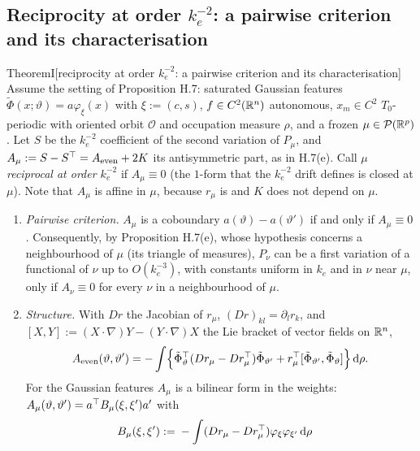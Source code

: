 \subsection{Reciprocity at order \texorpdfstring{$k_e^{-2}$}{k\_e\^{}-2}: a pairwise criterion and its
characterisation}

\begin{thm}{Theorem}{I}[reciprocity at order $k_e^{-2}$: a pairwise criterion and its characterisation]
Assume the setting of Proposition H.7: saturated Gaussian features $\tilde\Phi(x;\vartheta)=a\varphi_\xi(x)$ with
$\xi:=(c,s)$, $f\in C^2(\mathbb{R}^n)$ autonomous, $x_m\in C^2$ $T_0$-periodic with oriented orbit $\mathcal{O}$ and
occupation measure $\rho$, and a frozen $\mu\in\mathcal{P}(\mathbb{R}^p)$. Let $S$ be the $k_e^{-2}$ coefficient of the second
variation of $P_\mu$, and $A_\mu:=S-S^\top=A_{\mathrm{even}}+2K$ its antisymmetric part, as in H.7(e). Call $\mu$
\emph{reciprocal at order $k_e^{-2}$} if $A_\mu\equiv0$ (the $1$-form that the $k_e^{-2}$ drift defines is closed at
$\mu$). Note that $A_\mu$ is affine in $\mu$, because $r_\mu$ is and $K$ does not depend on $\mu$.
\begin{enumerate}[label=(\roman*)]
  \item \emph{Pairwise criterion.} $A_\mu$ is a coboundary $a(\vartheta)-a(\vartheta')$ if and only if
    $A_\mu\equiv0$. Consequently, by Proposition H.7(e), whose hypothesis concerns a neighbourhood of $\mu$ (its
    triangle of measures), $P_\nu$ can be a first variation of a functional of $\nu$ up to $O(k_e^{-3})$, with
    constants uniform in $k_e$ and in $\nu$ near $\mu$, only if $A_\nu\equiv0$ for every $\nu$ in a neighbourhood of
    $\mu$.
  \item \emph{Structure.} With $Dr$ the Jacobian of $r_\mu$, $(Dr)_{kl}=\partial_lr_k$, and
    $[X,Y]:=(X\cdot\nabla)Y-(Y\cdot\nabla)X$ the Lie bracket of vector fields on $\mathbb{R}^n$,
    \begin{equation}\label{eq:finitegain:AevenLie}
      A_{\mathrm{even}}(\vartheta,\vartheta')=-\int\Bigl\{\tilde\Phi_\vartheta^\top(Dr_\mu-Dr_\mu^\top)\tilde\Phi_{\vartheta'}
        +r_\mu^\top[\tilde\Phi_{\vartheta'},\tilde\Phi_\vartheta]\Bigr\}\,\mathrm{d}\rho.
    \end{equation}
    For the Gaussian features $A_\mu$ is a bilinear form in the weights:
    $A_\mu(\vartheta,\vartheta')=a^\top B_\mu(\xi,\xi')a'$ with
    \begin{gather}
      \begin{aligned}
        B_\mu(\xi,\xi'):={}&-\int(Dr_\mu-Dr_\mu^\T)\varphi_\xi\varphi_{\xi'}\dd\rho

\end{aligned}
\end{gather}
\end{enumerate}
\end{thm}
